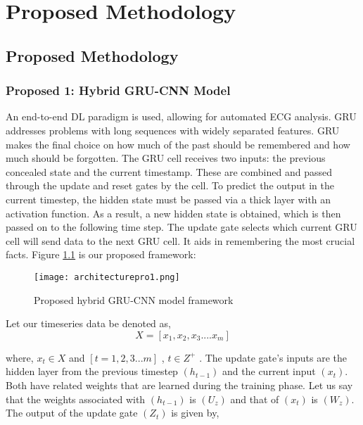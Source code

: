 
\chapter{Proposed Methodology} %

\label{c4} %


 \section{Proposed Methodology}
 
 
 \subsection{Proposed 1: Hybrid GRU-CNN Model}
 
 
 An end-to-end DL paradigm is used,  allowing for automated ECG analysis.  GRU addresses problems with long sequences with widely separated features. GRU makes the final choice on how much of the past should be remembered and how much should be forgotten. The GRU cell receives two inputs: the previous concealed state and the current timestamp. These are combined and passed through the update and reset gates by the cell. To predict the output in the current timestep,  the hidden state must be passed via a thick layer with an activation function. As a result,  a new hidden state is obtained,  which is then passed on to the following time step. The update gate selects which current GRU cell will send data to the next GRU cell. It aids in remembering the most crucial facts. Figure \ref{Fig:5} is our proposed framework:



    \begin{figure}
      \centering
      \texttt{[image: architecturepro1.png]}
      \caption{Proposed hybrid GRU-CNN model framework}
      \label{Fig:5}
    \end{figure}



 Let our timeseries data be denoted as, 
 \begin{equation}
  X = [ x_1,  x_2,  x_3.... x_m]
 \end{equation}

where,   $x_t \in X$ and $[t = 1, 2, 3...m]$ ,  $t \in Z^+$ . The update gate's inputs are the hidden layer from the previous timestep $(h_{t-1})$ and the current input $( x_t )$. Both have related weights that are learned during the training phase. Let us say that the weights associated with $(h_{t-1})$ is $( U_z )$ and that of $( x_t )$ is $( W_z )$. The output of the update gate $( Z_t )$ is given by, 

